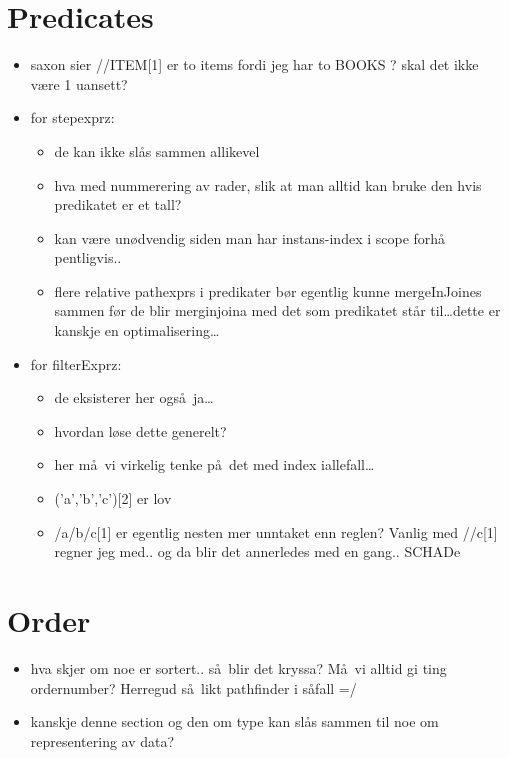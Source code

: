 


\section{Predicates}
\label{sect:discussion:predicates}
\begin{itemize}
  \item saxon sier //ITEM[1] er to items fordi jeg har to BOOKS ? skal det ikke
  v\ae re 1 uansett?
  \item for stepexprz: 

	\begin{itemize}
	  \item de kan ikke sl\aa s sammen allikevel
	  \item hva med nummerering av rader, slik at man alltid kan bruke den hvis
	  predikatet er et tall?
	  \item kan v\ae re un\o dvendig siden man har instans-index i scope forh\aa
	  pentligvis..
	  \item flere relative pathexprs i predikater b\o r egentlig kunne mergeInJoines sammen f\o r de blir merginjoina
	  med det som predikatet st\aa r til\ldots dette er kanskje en optimalisering\ldots
    \end{itemize}
  \item for filterExprz:
  	\begin{itemize}
	  \item de eksisterer her ogs\aa~ja\ldots
	  \item hvordan l\o se dette generelt?
	  \item her m\aa~vi virkelig tenke p\aa~det med index iallefall\ldots 
	  \item ('a','b','c')[2] er lov
	  \item /a/b/c[1] er egentlig nesten mer unntaket enn reglen? Vanlig med
	  //c[1] regner jeg med.. og da blir det annerledes med en gang.. SCHADe
    \end{itemize} 
\end{itemize}

\section{Order}
\label{sect:discussion:order}
\begin{itemize}
  \item hva skjer om noe er sortert.. s\aa~blir det kryssa? M\aa~vi alltid gi ting ordernumber? Herregud s\aa~likt
  pathfinder i s\aa fall =/
  \item kanskje denne section og den om type kan sl\aa s sammen til noe om representering av data?
\end{itemize}

